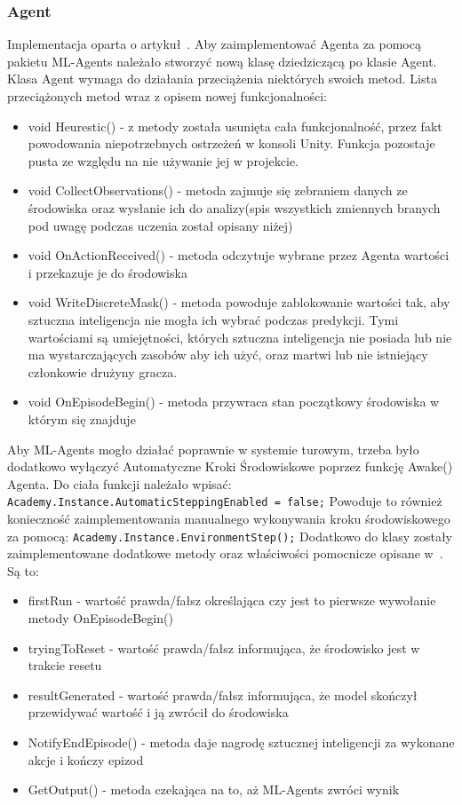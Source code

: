 \documentclass{SGGW-thesis}
\begin{document}
\subsubsection{Agent}
Implementacja oparta o artykuł~\cite{MLAgentsStartegyGuide}. Aby zaimplementować Agenta za pomocą pakietu ML-Agents należało stworzyć nową klasę dziedziczącą po klasie Agent. Klasa Agent wymaga do działania przeciążenia niektórych swoich metod.
Lista przeciążonych metod wraz z opisem nowej funkcjonalności:
\begin{itemize}
  \item{void Heurestic() - z metody została usunięta cała funkcjonalność, przez fakt powodowania niepotrzebnych ostrzeżeń w konsoli Unity. Funkcja pozostaje pusta ze względu na nie używanie jej w projekcie.}
  \item{void CollectObservations() - metoda zajmuje się zebraniem danych ze środowiska oraz wysłanie ich do analizy(spis wszystkich zmiennych branych pod uwagę podczas uczenia został opisany niżej)}
  \item{void OnActionReceived() - metoda odczytuje wybrane przez Agenta wartości i przekazuje je do środowiska}
  \item{void WriteDiscreteMask() - metoda powoduje zablokowanie wartości tak, aby sztuczna inteligencja nie mogła ich wybrać podczas predykcji. Tymi wartościami są umiejętności, których sztuczna inteligencja nie posiada lub nie ma wystarczających zasobów aby ich użyć, oraz martwi lub nie istniejący członkowie drużyny gracza.}
  \item{void OnEpisodeBegin() - metoda przywraca stan początkowy środowiska w którym się znajduje}
\end{itemize}
Aby ML-Agents mogło działać poprawnie w systemie turowym, trzeba było dodatkowo wyłączyć Automatyczne Kroki Środowiskowe poprzez funkcję Awake() Agenta. Do ciała funkcji należało wpisać: \verb|Academy.Instance.AutomaticSteppingEnabled = false;|
Powoduje to również konieczność zaimplementowania manualnego wykonywania kroku środowiskowego za pomocą: \verb|Academy.Instance.EnvironmentStep();|
Dodatkowo do klasy zostały zaimplementowane dodatkowe metody oraz właściwości pomocnicze opisane w~\cite{MLAgentsStartegyGuide}. Są to:
\begin{itemize}
  \item{firstRun - wartość prawda/fałsz określająca czy jest to pierwsze wywołanie metody OnEpisodeBegin()}
  \item{tryingToReset - wartość prawda/fałsz informująca, że środowisko jest w trakcie resetu}
  \item{resultGenerated - wartość prawda/fałsz informująca, że model skończył przewidywać wartość i ją zwrócił do środowiska}
  \item{NotifyEndEpisode() - metoda daje nagrodę sztucznej inteligencji za wykonane akcje i kończy epizod}
  \item{GetOutput() - metoda czekająca na to, aż ML-Agents zwróci wynik}
\end{itemize}
\end{document}
